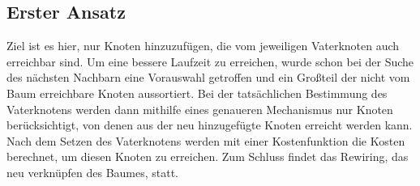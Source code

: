 \subsection{Erster Ansatz}
Ziel ist es hier, nur Knoten hinzuzufügen, die vom jeweiligen Vaterknoten auch erreichbar sind. Um eine bessere Laufzeit zu erreichen, wurde schon bei der Suche des nächsten Nachbarn eine Vorauswahl getroffen und ein Großteil der nicht vom Baum erreichbare Knoten aussortiert. Bei der tatsächlichen Bestimmung des Vaterknotens werden dann mithilfe eines genaueren Mechanismus nur Knoten berücksichtigt, von denen aus der neu hinzugefügte Knoten erreicht werden kann. \\
Nach dem Setzen des Vaterknotens werden mit einer Kostenfunktion die Kosten berechnet, um diesen Knoten zu erreichen. Zum Schluss findet das Rewiring, das neu verknüpfen des Baumes, statt.
